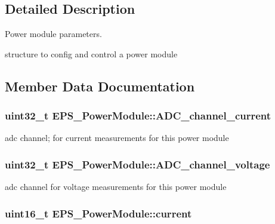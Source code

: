 \subsection{Detailed Description}
Power module parameters. 

structure to config and control a power module 

\subsection{Member Data Documentation}
\hypertarget{struct_e_p_s___power_module_a97992f5d4595a30086e1c7c1ee0d1225}{
\subsubsection[{A\-D\-C\-\_\-channel\-\_\-current}]{\setlength{\rightskip}{0pt plus 5cm}uint32\-\_\-t E\-P\-S\-\_\-\-Power\-Module\-::\-A\-D\-C\-\_\-channel\-\_\-current}}\label{struct_e_p_s___power_module_a97992f5d4595a30086e1c7c1ee0d1225}
adc channel; for current measurements for this power module \hypertarget{struct_e_p_s___power_module_a01f651d33935804c5c6b32d063c09c9a}{
\subsubsection[{A\-D\-C\-\_\-channel\-\_\-voltage}]{\setlength{\rightskip}{0pt plus 5cm}uint32\-\_\-t E\-P\-S\-\_\-\-Power\-Module\-::\-A\-D\-C\-\_\-channel\-\_\-voltage}}\label{struct_e_p_s___power_module_a01f651d33935804c5c6b32d063c09c9a}
adc channel for voltage measurements for this power module \hypertarget{struct_e_p_s___power_module_a641fa79c7e6e507facb56591efb6f5c2}{
\subsubsection[{current}]{\setlength{\rightskip}{0pt plus 5cm}uint16\-\_\-t E\-P\-S\-\_\-\-Power\-Module\-::current}}\label{struct_e_p_s___power_module_a641fa79c7e6e507facb56591efb6f5c2}
